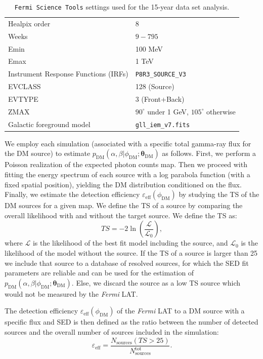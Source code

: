 \documentclass[12pt, a4paper]{article}
\newcommand{\Fermi}{\textsl{Fermi}}
\newcommand{\be}{\begin{equation}}
\newcommand{\ee}{\end{equation}}
\newcommand{\btheta}{\boldsymbol{\theta}}
\begin{document}
\begin{table}[t]
\centering
\begin{tabular}{ | l| l|  }
\hline
Healpix order & 8\\ 
Weeks & $9-795$\\ 
Emin & 100 MeV\\
Emax & 1 TeV\\
Instrument Response Functions (IRFs) & \texttt{P8R3\_SOURCE\_V3} \\
EVCLASS & 128 (Source)\\ 
EVTYPE & 3 (Front+Back)\\
ZMAX & $90^\circ$ under 1 GeV, $105^\circ$ otherwise\\
Galactic foreground model & \verb|gll_iem_v7.fits| \\
\hline
\end{tabular}
\caption{\texttt{Fermi Science Tools} settings used for the 15-year data set analysis.}
\label{tab:settings}
\end{table}

We employ each simulation (associated with a specific total gamma-ray flux for the DM source) to estimate $p_\textrm{DM}(\alpha,\beta|\phi_\textrm{DM};\btheta_\textrm{DM})$ as follows.
First, we perform a Poisson realization of the expected photon counts map.
Then we proceed with fitting the energy spectrum of each source with a log parabola function (with a fixed spatial position), yielding the DM distribution conditioned on the flux.
Finally, we estimate the detection efficiency $\varepsilon_\textrm{eff}(\phi_\textrm{DM})$ by studying the TS of the DM sources for a given map. We define the TS of a source by comparing the overall likelihood with and without the target source. We define the TS as:
\begin{equation}
TS = -2\ln\left(\frac{\mathcal{L}}{\mathcal{L}_0}\right),
\end{equation}
where $\mathcal{L}$ is the likelihood of the best fit model including the source, and $\mathcal{L}_0$ is the likelihood of the model without the source. 
If the TS of a source is larger than 25 we include that source to a database of resolved sources, for which the SED fit parameters are reliable and can be used for the estimation of $p_\textrm{DM}(\alpha,\beta|\phi_\textrm{DM};\btheta_\textrm{DM})$. Else, we discard the source as a low TS source which would not be measured by the {\Fermi} LAT.

The detection efficiency $\varepsilon_\textrm{eff}(\phi_\textrm{DM})$ of the {\Fermi} LAT to a DM source with a specific flux and SED is then defined as the ratio between the number of detected sources and the overall number of sources included in the simulation: 
\be
\varepsilon_\textrm{eff} = \frac{N_\textrm{sources}(TS>25)}{N_\textrm{sources}^\textrm{tot}}.
\ee
\end{document}
